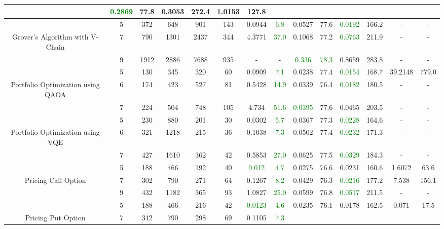 \begin{table}[htb]
{\begin{tabular}{|c|c|c|c|c|c|c|c|c|c|c|c|c|c|}
 & \textcolor{green}{0.2869} & 77.8
 & 0.3053 & 272.4
 & 1.0153 & 127.8
 \\
\hline
 & 
5 & 372 & 648 & 901 & 143
 & 0.0944 & \textcolor{green}{6.8}
 & 0.0527 & 77.6
 & \textcolor{green}{0.0192} & 166.2
 & - & -
 \\
Grover's Algorithm with V-Chain & 
7 & 790 & 1301 & 2437 & 344
 & 4.3771 & \textcolor{green}{37.0}
 & 0.1068 & 77.2
 & \textcolor{green}{0.0763} & 211.9
 & - & -
 \\
 & 
9 & 1912 & 2886 & 7688 & 935
 & - & -
 & \textcolor{green}{0.336} & \textcolor{green}{78.3}
 & 0.8659 & 283.8
 & - & -
 \\
\hline
 & 
5 & 130 & 345 & 320 & 60
 & 0.0909 & \textcolor{green}{7.1}
 & 0.0238 & 77.4
 & \textcolor{green}{0.0154} & 168.7
 & 39.2148 & 779.0
 \\
Portfolio Optimization using QAOA & 
6 & 174 & 423 & 527 & 81
 & 0.5428 & \textcolor{green}{14.9}
 & 0.0339 & 76.4
 & \textcolor{green}{0.0182} & 180.5
 & - & -
 \\
 & 
7 & 224 & 504 & 748 & 105
 & 4.734 & \textcolor{green}{51.6}
 & \textcolor{green}{0.0395} & 77.6
 & 0.0465 & 203.5
 & - & -
 \\
\hline
 & 
5 & 230 & 880 & 201 & 30
 & 0.0302 & \textcolor{green}{5.7}
 & 0.0367 & 77.3
 & \textcolor{green}{0.0228} & 164.6
 & - & -
 \\
Portfolio Optimization using VQE & 
6 & 321 & 1218 & 215 & 36
 & 0.1038 & \textcolor{green}{7.3}
 & 0.0502 & 77.4
 & \textcolor{green}{0.0232} & 171.3
 & - & -
 \\
 & 
7 & 427 & 1610 & 362 & 42
 & 0.5853 & \textcolor{green}{27.0}
 & 0.0625 & 77.5
 & \textcolor{green}{0.0329} & 184.3
 & - & -
 \\
\hline
 & 
5 & 188 & 466 & 192 & 40
 & \textcolor{green}{0.012} & \textcolor{green}{4.7}
 & 0.0275 & 76.6
 & 0.0231 & 160.6
 & 1.6072 & 63.6
 \\
Pricing Call Option & 
7 & 302 & 790 & 271 & 64
 & 0.1267 & \textcolor{green}{8.2}
 & 0.0429 & 76.3
 & \textcolor{green}{0.0216} & 177.2
 & 7.538 & 156.1
 \\
 & 
9 & 432 & 1182 & 365 & 93
 & 1.0827 & \textcolor{green}{25.0}
 & 0.0599 & 76.8
 & \textcolor{green}{0.0517} & 211.5
 & - & -
 \\
\hline
 & 
5 & 188 & 466 & 216 & 42
 & \textcolor{green}{0.0123} & \textcolor{green}{4.6}
 & 0.0235 & 76.1
 & 0.0178 & 162.5
 & 0.071 & 17.5
 \\
Pricing Put Option & 
7 & 342 & 790 & 298 & 69
 & 0.1105 & \textcolor{green}{7.3}

\end{tabular}}
\end{table}
